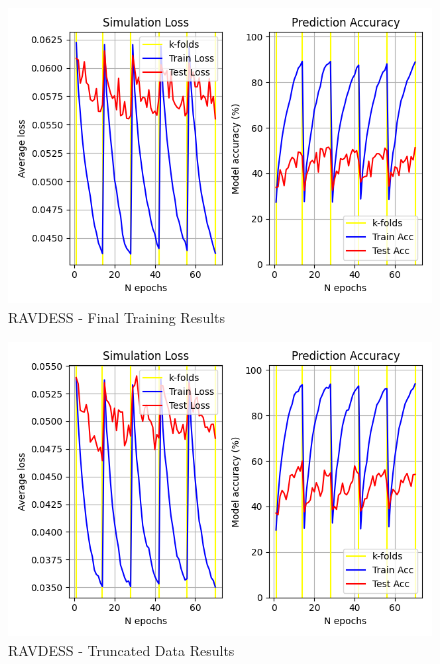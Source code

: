 \begin{figure}[ht]
        \centering
        \includegraphics[scale = 0.6]{images_results/RAVDESS-FinalResults/RAVDESS_Results_31-05__19-18.png}
        \caption{RAVDESS - Final Training Results}
        \label{ravdess_final_results}
\end{figure}
\begin{figure}[ht]
        \centering
        \includegraphics[scale = 0.6]{images_results/RAVDESS-FinalResults/RAVDESS_Results_01-06__12-17.png}
        \caption{RAVDESS - Truncated Data Results}
        \label{ravdess_trunc_results}
\end{figure}



